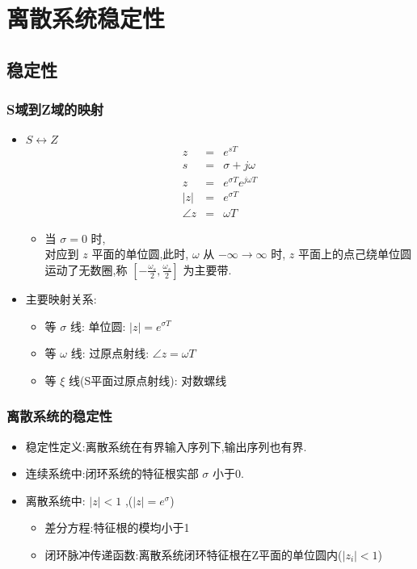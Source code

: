 \documentclass[table]{beamer}
\begin{document}
\section{离散系统稳定性}
\label{sec-5}
\subsection{稳定性}
\label{sec-5-1}
\begin{frame}
\frametitle{S域到Z域的映射}
\label{sec-5-1-1}
\begin{itemize}

\item $S\leftrightarrow Z$
\label{sec-5-1-1-1}%
\begin{eqnarray*}
z & = & e^{sT}\\
s &=& \sigma+j\omega \\
z &=& e^{\sigma T}e^{j\omega T} \\
|z| &=& e^{\sigma T} \\
\angle z &=& \omega T
\end{eqnarray*}
\begin{itemize}

\item 当  $\sigma=0$  时,\\
\label{sec-5-1-1-1-1}%
对应到  $z$  平面的单位圆,此时,  $\omega$  从  $-\infty\rightarrow\infty$ 时,  $z$  平面上的点己绕单位圆运动了无数圈,称  $[-\frac{\omega_s}{2},\frac{\omega_s}{2}]$  为主要带.

\end{itemize} %

\item 主要映射关系:
\label{sec-5-1-1-2}%
\begin{itemize}
\item 等  $\sigma$  线: 单位圆:   $|z|=e^{\sigma T}$
\item 等  $\omega$  线: 过原点射线:  $\angle z=\omega T$
\item 等  $\xi$  线(S平面过原点射线): 对数螺线
\end{itemize}

\end{itemize} %
\end{frame}
\begin{frame}
\frametitle{离散系统的稳定性}
\label{sec-5-1-2}

\begin{itemize}
\item 稳定性定义:离散系统在有界输入序列下,输出序列也有界.
\item <2->连续系统中:闭环系统的特征根实部 $\sigma$  小于0.
\item <3->离散系统中:  $|z|<1$ ,($|z|=e^{\sigma}$)
\begin{itemize}
\item 差分方程:特征根的模均小于1
\item 闭环脉冲传递函数:离散系统闭环特征根在Z平面的单位圆内($|z_i|<1$)
\end{itemize}
\end{itemize}
\end{frame}
\end{document}
